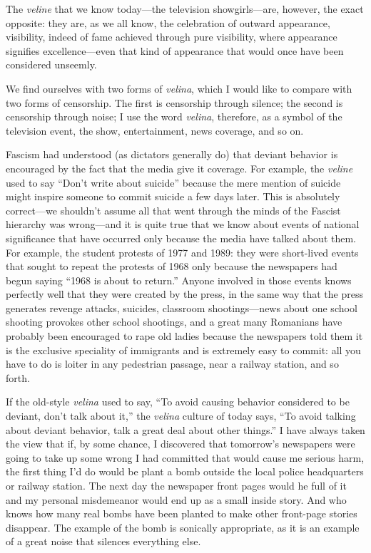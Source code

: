 \documentclass[11pt,twocolumn]{article}
\begin{document}
The \emph{veline} that we know today---the television showgirls---are,
however, the exact opposite: they are, as we all know, the celebration
of outward appearance, visibility, indeed of fame achieved through
pure visibility, where appearance signifies excellence---even that
kind of appearance that would once have been considered unseemly.

We find ourselves with two forms of \emph{velina}, which I would like to
compare with two forms of censorship. The first is censorship through
silence; the second is censorship through noise; I use the word
\emph{velina}, therefore, as a symbol of the television event, the show,
entertainment, news coverage, and so on.

Fascism had understood (as dictators generally do) that deviant
behavior is encouraged by the fact that the media give it coverage.
For example, the \emph{veline} used to say ``Don't write about suicide''
because the mere mention of suicide might inspire someone to commit
suicide a few days later. This is absolutely correct---we shouldn't
assume all that went through the minds of the Fascist hierarchy was
wrong---and it is quite true that we know about events of national
significance that have occurred only because the media have talked
about them. For example, the student protests of 1977 and 1989:
they were short-lived events that sought to repeat the protests of
1968 only because the newspapers had begun saying ``1968 is about
to return.'' Anyone involved in those events knows perfectly well
that they were created by the press, in the same way that the press
generates revenge attacks, suicides, classroom shootings---news
about one school shooting provokes other school shootings, and a
great many Romanians have probably been encouraged to rape old
ladies because the newspapers told them it is the exclusive speciality
of immigrants and is extremely easy to commit: all you have to do
is loiter in any pedestrian passage, near a railway station, and
so forth.

If the old-style \emph{velina} used to say, ``To avoid causing behavior
considered to be deviant, don't talk about it,'' the \emph{velina} culture
of today says, ``To avoid talking about deviant behavior, talk a
great deal about other things.'' I have always taken the view that
if, by some chance, I discovered that tomorrow's newspapers were
going to take up some wrong I had committed that would cause me
serious harm, the first thing I'd do would be plant a bomb outside
the local police headquarters or railway station. The next day the
newspaper front pages would he full of it and my personal misdemeanor
would end up as a small inside story. And who knows how many real
bombs have been planted to make other front-page stories disappear.
The example of the bomb is sonically appropriate, as it is an example
of a great noise that silences everything else.
\end{document}

